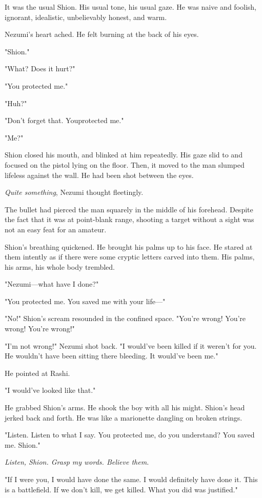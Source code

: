 It was the usual Shion. His usual tone, his usual gaze. He was naive and
foolish, ignorant, idealistic, unbelievably honest, and warm.

Nezumi's heart ached. He felt burning at the back of his eyes.

"Shion."

"What? Does it hurt?"

"You protected me."

"Huh?"

"Don't forget that. You\el protected me."

"Me?"

Shion closed his mouth, and blinked at him repeatedly. His gaze slid to
and focused on the pistol lying on the floor. Then, it moved to the man
slumped lifeless against the wall. He had been shot between the eyes.

\emph{Quite something}, Nezumi thought fleetingly.

The bullet had pierced the man squarely in the middle of his forehead.
Despite the fact that it was at point-blank range, shooting a target
without a sight was not an easy feat for an amateur.

Shion's breathing quickened. He brought his palms up to his face. He
stared at them intently as if there were some cryptic letters carved
into them. His palms, his arms, his whole body trembled.

"Nezumi---what have I done?"

"You protected me. You saved me with your life---"

"No!" Shion's scream resounded in the confined space. "You're wrong!
You're wrong! You're wrong!"

"I'm not wrong!" Nezumi shot back. "I would've been killed if it weren't
for you. He wouldn't have been sitting there bleeding. It would've been
me."

He pointed at Rashi.

"I would've looked like that."

He grabbed Shion's arms. He shook the boy with all his might. Shion's
head jerked back and forth. He was like a marionette dangling on broken
strings.

"Listen. Listen to what I say. You protected me, do you understand? You
saved me. Shion."

\emph{Listen, Shion. Grasp my words. Believe them.}

"If I were you, I would have done the same. I would definitely have done
it. This is a battlefield. If we don't kill, we get killed. What you did
was justified."

